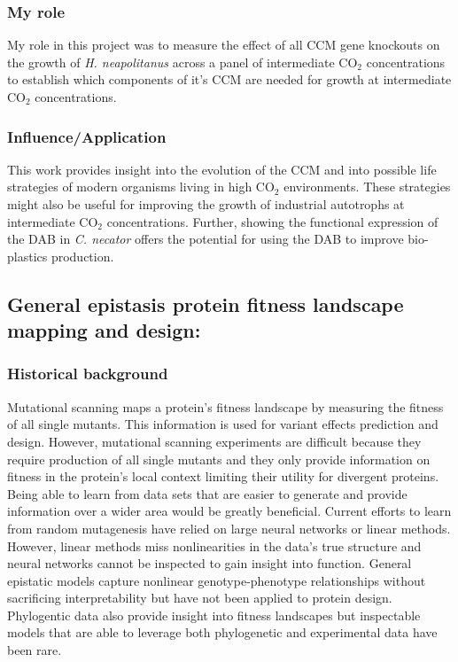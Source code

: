 \documentclass{article}
\begin{document}
\subsubsection{My role}
My role in this project was to measure the effect of all CCM gene knockouts on the growth of \textit{H. neapolitanus} across a panel of intermediate CO$_2$ concentrations to establish which components of it's CCM are needed for growth at intermediate CO$_2$ concentrations.
%
\subsubsection{Influence/Application}
This work provides insight into the evolution of the CCM and into possible life strategies of modern organisms living in high CO$_2$ environments.
These strategies might also be useful for improving the growth of industrial autotrophs at intermediate CO$_2$ concentrations.
Further, showing the functional expression of the DAB in \textit{C. necator} offers the potential for using the DAB to improve bio-plastics production.

%
\nocite{Flamholz2022-yo}
\printbibliography[heading=none]

\leavevmode\pagebreak

\subsection{General epistasis protein fitness landscape mapping and design:}
\subsubsection{Historical background}
Mutational scanning maps a protein's fitness landscape by measuring the fitness of all single mutants.
This information is used for variant effects prediction and design.
However, mutational scanning experiments are difficult because they require production of all single mutants and they only provide information on fitness in the protein's local context limiting their utility for divergent proteins.
Being able to learn from data sets that are easier to generate and provide information over a wider area would be greatly beneficial.
Current efforts to learn from random mutagenesis have relied on large neural networks or linear methods.
However, linear methods miss nonlinearities in the data's true structure and neural networks cannot be inspected to gain insight into function.
General epistatic models capture nonlinear genotype-phenotype relationships without sacrificing interpretability but have not been applied to protein design.
Phylogentic data also provide insight into fitness landscapes but inspectable models that are able to leverage both phylogenetic and experimental data have been rare.
%
\end{document}
